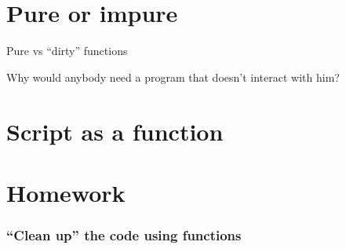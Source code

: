 \documentclass[aspectratio=169]{beamer}
\begin{document}
\begin{frame}[fragile]
  
  \vspace{1.5cm}
  
\end{frame}

\begin{frame}[fragile]
  
  \vspace{1.5cm}
  
\end{frame}

\begin{frame}[fragile]
  
  \vspace{1.5cm}
  
\end{frame}


\begin{frame}[fragile]
  
\end{frame}

\begin{frame}[fragile]
  
\end{frame}

\section{Pure or impure}

\begin{frame}
\centering
\Huge
Pure vs ``dirty'' functions
\end{frame}

\begin{frame}[fragile]
  
\end{frame}

\begin{frame}[fragile]
  
\end{frame}

\begin{frame}[fragile]
  
\end{frame}

\begin{frame}
Why would anybody need a program that doesn't interact with him?
\end{frame}

\section{Script as a function}

\begin{frame}[fragile]
  
  \vspace{1.5cm}
  
\end{frame}

\section{Homework}

\begin{frame}[fragile]
  \frametitle{``Clean up'' the code using functions}
  
\end{frame}
\end{document}
